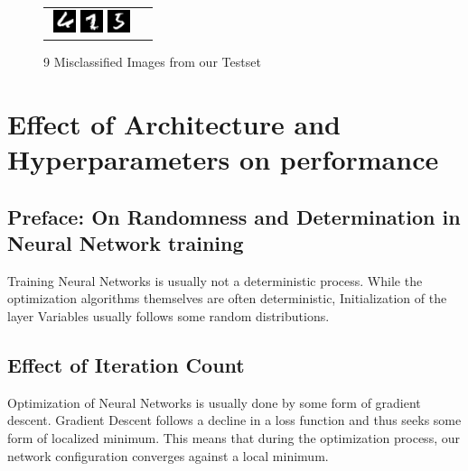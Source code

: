 \documentclass{article}
\begin{document}
\begin{figure}
\begin{tabular}{cc}
\includegraphics[width=0.27\textwidth]{imgs/mis7.png}    \includegraphics[width=0.27\textwidth]{imgs/mis8.png}    \includegraphics[width=0.27\textwidth]{imgs/mis9.png} \\
\end{tabular}
\caption{9 Misclassified Images from our Testset}\label{misclassified}
\end{figure}

\section{Effect of Architecture and Hyperparameters on performance}


\subsection{Preface: On Randomness and Determination in Neural Network training}
Training Neural Networks is usually not a deterministic process. While the optimization algorithms themselves are often deterministic, Initialization of the layer Variables usually follows some random distributions.


\subsection{Effect of Iteration Count}
Optimization of Neural Networks is usually done by some form of gradient descent. Gradient Descent follows a decline in a loss function and thus seeks some form of localized minimum. This means that during the optimization process, our network configuration converges against a local minimum.
\end{document}
